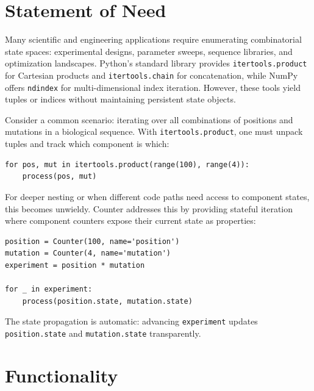 \documentclass[10pt,a4paper,onecolumn]{article}
\begin{document}
\section{Statement of Need}

Many scientific and engineering applications require enumerating combinatorial
state spaces: experimental designs, parameter sweeps, sequence libraries, and
optimization landscapes. Python's standard library provides \texttt{itertools.product}
for Cartesian products and \texttt{itertools.chain} for concatenation, while NumPy
offers \texttt{ndindex} for multi-dimensional index iteration. However, these tools
yield tuples or indices without maintaining persistent state objects.

Consider a common scenario: iterating over all combinations of positions and
mutations in a biological sequence. With \texttt{itertools.product}, one must
unpack tuples and track which component is which:

\begin{lstlisting}
for pos, mut in itertools.product(range(100), range(4)):
    process(pos, mut)
\end{lstlisting}

For deeper nesting or when different code paths need access to component states,
this becomes unwieldy. Counter addresses this by providing stateful iteration
where component counters expose their current state as properties:

\begin{lstlisting}
position = Counter(100, name='position')
mutation = Counter(4, name='mutation')
experiment = position * mutation

for _ in experiment:
    process(position.state, mutation.state)
\end{lstlisting}

The state propagation is automatic: advancing \texttt{experiment} updates
\texttt{position.state} and \texttt{mutation.state} transparently.

\section{Functionality}
\end{document}
